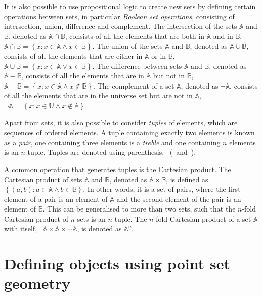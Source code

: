 It is also possible to use propositional logic to create new sets by defining certain operations between sets, in particular \emph{Boolean set operations}, consisting of intersection, union, difference and complement.
The intersection of the sets \(\mathbb{A}\) and \(\mathbb{B}\), denoted as \(\mathbb{A} \cap \mathbb{B}\), consists of all the elements that are both in \(\mathbb{A}\) and in \(\mathbb{B}\), \ie\ \(\mathbb{A} \cap \mathbb{B} = \left\{ x : x \in \mathbb{A} \wedge x \in \mathbb{B} \right\}\).
The union of the sets \(\mathbb{A}\) and \(\mathbb{B}\), denoted as \(\mathbb{A} \cup \mathbb{B}\), consists of all the elements that are either in \(\mathbb{A}\) or in \(\mathbb{B}\), \ie\ \(\mathbb{A} \cup \mathbb{B} = \left\{ x : x \in \mathbb{A} \vee x \in \mathbb{B} \right\}\).
The difference between sets \(\mathbb{A}\) and \(\mathbb{B}\), denoted as \(\mathbb{A} - \mathbb{B}\), consists of all the elements that are in \(\mathbb{A}\) but not in \(\mathbb{B}\), \ie\ \(\mathbb{A} - \mathbb{B} = \left\{ x : x \in \mathbb{A} \wedge x \notin \mathbb{B} \right\}\).
The complement of a set \(\mathbb{A}\), denoted as \(\neg \mathbb{A}\), consists of all the elements that are in the universe set but are not in \(\mathbb{A}\), \ie\ \(\neg \mathbb{A} = \left\{ x : x \in \mathbb{U} \wedge x \notin \mathbb{A} \right\}\).

Apart from sets, it is also possible to consider \emph{tuples} of elements, which are sequences of ordered elements.
A tuple containing exactly two elements is known as a \emph{pair}, one containing three elements is a \emph{treble} and one containing \(n\) elements is an \(n\)-tuple.
Tuples are denoted using parenthesis, \ie\ (\ and~).

A common operation that generates tuples is the Cartesian product.
The Cartesian product of sets \(\mathbb{A}\) and \(\mathbb{B}\), denoted as \(\mathbb{A} \times \mathbb{B}\), is defined as \(\left\{ (a,b) : a \in \mathbb{A} \wedge b \in \mathbb{B} \right\}\).
In other words, it is a set of pairs, where the first element of a pair is an element of \(\mathbb{A}\) and the second element of the pair is an element of \(\mathbb{B}\).
This can be generalised to more than two sets, such that the \(n\)-fold Cartesian product of \(n\) sets is an \(n\)-tuple.
The \(n\)-fold Cartesian product of a set \(\mathbb{A}\) with itself, \ie\ \(\mathbb{A} \times \mathbb{A} \times \cdots \mathbb{A}\), is denoted as \(\mathbb{A}^n\).

\section{Defining objects using point set geometry}%
\label{sec:ps}

